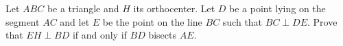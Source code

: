 Let $ABC$ be a triangle and $H$ its orthocenter. Let $D$ be a point lying on the segment $AC$ and let $E$ be the point on the line $BC$ such that $BC\perp DE$. Prove that $EH\perp BD$ if and only if $BD$ bisects $AE$.